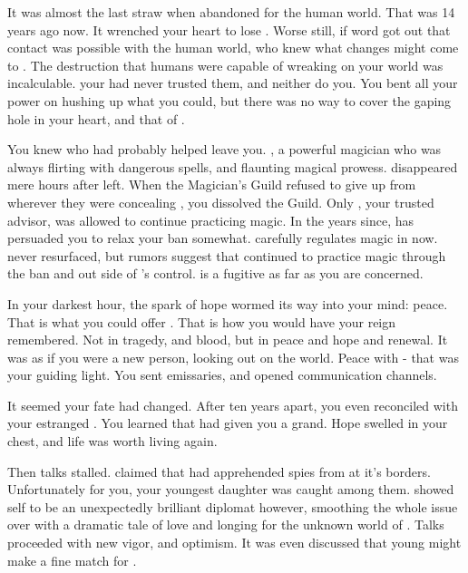 \documentclass[char]{NeptuneBall}
\begin{document}
It was almost the last straw when \cAriel{\Prince} \cAriel{} abandoned \pAtlantis{} for the human world. That was 14 years ago now.  It wrenched your heart to lose \cAriel{\them{}}. Worse still, if word got out that contact was possible with the human world, who knew what changes might come to \pAtlantis{}. The destruction that humans were capable of wreaking on your world was incalculable. your \cExKing{\parent} had never trusted them, and neither do you. You bent all your power on hushing up what you could, but there was no way to cover the gaping hole in your heart, and that of \pAtlantis{}. 

You knew who had probably helped \cAriel{} leave you. \cWitch{}, a powerful magician who was always flirting with dangerous spells, and flaunting \cWitch{\their} magical prowess. \cWitch{\They} disappeared mere hours after \cAriel{} left. When the Magician's Guild refused to give \cWitch{\them} up from wherever they were concealing \cWitch{\them}, you dissolved the Guild. Only \cManta{}, your trusted advisor, was allowed to continue practicing magic. In the years since, \cManta{} has persuaded you to relax your ban somewhat. \cManta{} carefully regulates magic in \pAtlantis{} now. \cWitch{} never resurfaced, but rumors suggest that \cWitch{\they} continued to practice magic through the ban and out side of \cManta{}'s control. \cWitch{} is a fugitive as far as you are concerned.

In your darkest hour, the spark of hope wormed its way into your mind: peace. That is what you could offer \pAtlantis{}. That is how you would have your reign remembered. Not in tragedy, and blood, but in peace and hope and renewal. It was as if you were a new person, looking out on the world. Peace with \pPacifica{} - that was your guiding light. You sent emissaries, and opened communication channels. 

It seemed your fate had changed. After ten years apart, you even reconciled with your estranged \cAriel{\offspring} \cAriel{}.  You learned that \cAriel{} had given you a grand\cWillow{\offspring}. Hope swelled in your chest, and life was worth living again.  

Then talks stalled. \pPacifica{} claimed that had apprehended spies from \pAtlantis{} at it's borders. Unfortunately for you, your youngest daughter \cPrincess{} was caught among them. \cPrincess{\They} showed \cPrincess{\them}self to be an unexpectedly brilliant diplomat however, smoothing the whole issue over with a dramatic tale of love and longing for the unknown world of \pPacifica{}. Talks proceeded with new vigor, and optimism. It was even discussed that young \cPrince{\prince} \cPrince{} might make a fine match for \cPrincess{}.
\end{document}
